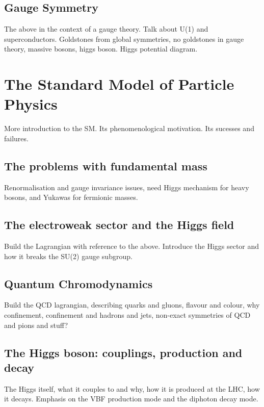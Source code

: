 \subsection{Gauge Symmetry}
The above in the context of a gauge theory. Talk about U(1) and superconductors. Goldstones from global symmetries, no goldstones in gauge theory, massive bosons, higgs boson. Higgs potential diagram. 



\section{The Standard Model of Particle Physics}
More introduction to the SM. Its phenomenological motivation. Its sucesses and failures. 

\subsection{The problems with fundamental mass}
Renormalisation and gauge invariance issues, need Higgs mechanism for heavy bosons, and Yukawas for fermionic masses.

\subsection{The electroweak sector and the Higgs field}
Build the Lagrangian with reference to the above. Introduce the Higgs sector and how it breaks the SU(2) gauge subgroup.

\subsection{Quantum Chromodynamics}
Build the QCD lagrangian, describing quarks and gluons, flavour and colour, why confinement, confinement and hadrons and jets, non-exact symmetries of QCD and pions and stuff?

\subsection{The Higgs boson: couplings, production and decay}
The Higgs itself, what it couples to and why, how it is produced at the LHC, how it decays. Emphasis on the VBF production mode and the diphoton decay mode. 
